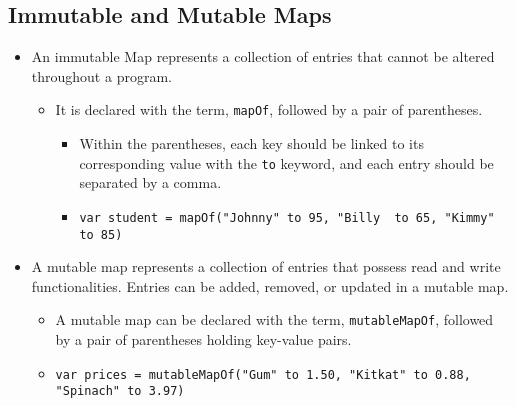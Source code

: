 \subsection{Immutable and Mutable Maps}
\begin{itemize}
    \item An immutable Map represents a collection of entries that cannot be altered throughout a program.
          \begin{itemize}
              \item It is declared with the term, \verb!mapOf!, followed by a pair of parentheses.
                    \begin{itemize}
                        \item Within the parentheses, each key should be linked to its corresponding value with the
                              \verb!to! keyword, and each entry should be separated by a comma.
                        \item \verb!var student = mapOf("Johnny" to 95, "Billy  to 65, "Kimmy" to 85)!
                    \end{itemize}
          \end{itemize}
\end{itemize}

\begin{itemize}
    \item A mutable map represents a collection of entries that possess read and write functionalities. 
    Entries can be added, removed, or updated in a mutable map.
    \begin{itemize}
        \item A mutable map can be declared with the term, \verb!mutableMapOf!, 
        followed by a pair of parentheses holding key-value pairs.
        \item \verb!var prices = mutableMapOf("Gum" to 1.50, "Kitkat" to 0.88, "Spinach" to 3.97)!
    \end{itemize}
\end{itemize}
